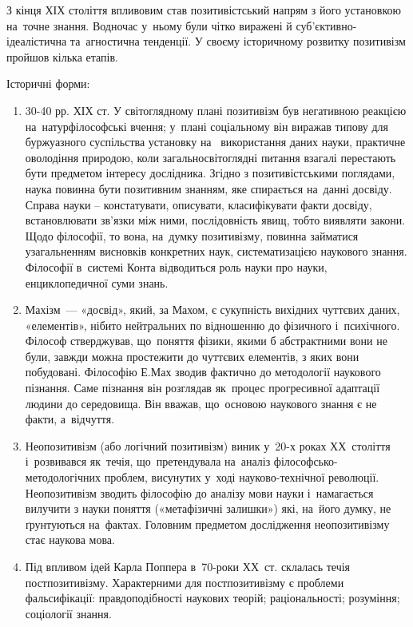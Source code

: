\documentclass[a5paper,oneside,DIV=12,12pt,headings=small]{scrartcl}
\begin{document}
		З кінця ХІХ століття впливовим став позитивістський напрям з його установкою на~точне знання. Водночас у~ньому були чітко виражені й суб'\-єк\-тив\-но-іде\-а\-ліс\-тич\-на та~агностична тенденції. У своєму історичному розвитку позитивізм пройшов кілька етапів.
		
		Історичні форми:
		\begin{enumerate}
			\item 30-40 рр. ХІХ ст. У світоглядному плані позитивізм був негативною реакцією на~натурфілософські вчення; у~плані  соціальному він виражав типову для  буржуазного суспільства установку на~ використання даних науки, практичне оволодіння природою, коли загальносвітоглядні питання  взагалі перестають бути предметом інтересу дослідника. Згідно з позитивістськими поглядами, наука повинна бути позитивним знанням, яке спирається на~данні досвіду. Справа науки – констатувати, описувати, класифікувати факти досвіду, встановлювати зв'язки між ними, послідовність явищ, тобто виявляти закони. Щодо філософії, то вона, на~думку позитивізму, повинна займатися узагальненням висновків конкретних наук, систематизацією наукового знання. Філософії в~системі Конта відводиться роль науки про науки, енциклопедичної суми знань.
			\item Махізм~— «досвід», який, за Махом, є сукупність вихідних чуттєвих даних, «елементів», нібито нейтральних по відношенню до фізичного і~психічного. Філософ стверджував, що~поняття фізики, якими б абстрактними вони не були, завжди можна простежити до чуттєвих елементів, з яких вони побудовані.   Філософію Е.Мах зводив фактично до методології наукового пізнання. Саме пізнання  він розглядав як~процес прогресивної адаптації людини до середовища. Він вважав, що~основою наукового знання є не факти, а~відчуття.  
			\item Неопозитивізм (або логічний позитивізм) виник у~20-х роках ХХ~століття і~розвивався як~течія, що~претендувала на~аналіз філософсько-методологічних проблем, висунутих у~ході науково-технічної революції. Неопозитивізм зводить філософію до аналізу мови науки і~намагається вилучити з науки поняття («метафізичні залишки») які, на~його думку, не ґрунтуються на~фактах. Головним предметом  дослідження неопозитивізму стає наукова мова.
			\item Під впливом ідей Карла Поппера в~70-роки ХХ~ст. склалась течія постпозитивізму. Характерними для  постпозитивізму є проблеми фальсифікації: правдоподібності наукових теорій; раціональності; розуміння; соціології знання.
		\end{enumerate}
\end{document}
